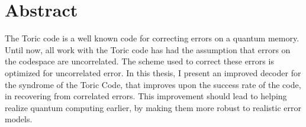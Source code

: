 \chapter{Abstract}

The Toric code is a well known code for correcting errors on a quantum memory. Until now, all work with the Toric code has had the assumption that errors on the codespace are uncorrelated. The scheme used to correct these errors is optimized for uncorrelated error. In this thesis, I present an improved decoder for the syndrome of the Toric Code, that improves upon the success rate of the code, in recovering from correlated errors. This improvement should lead to helping realize quantum computing earlier, by making them more robust to realistic error models. 